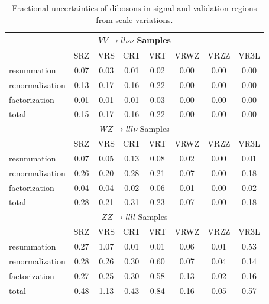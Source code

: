 \begin{table}
	\begin{center}
 		\begin{tabular}{l|c|c|c|c|c|c|c}
		    \hline \hline 
   			\multicolumn{8}{c}{$VV \rightarrow ll\nu\nu$ Samples} \\
  	 		\hline
			&	SRZ & VRS & CRT & VRT & VRWZ & VRZZ & VR3L \\
			\hline
			resummation & 0.07 & 0.03 & 0.01 & 0.02 & 0.00 & 0.00 & 0.00 \\
			renormalization & 0.13 & 0.17 & 0.16 & 0.22 & 0.00 & 0.00 & 0.00 \\
			factorization & 0.01 & 0.01 & 0.01 & 0.03 & 0.00 & 0.00 & 0.00 \\
			total & 0.15 & 0.17 & 0.16 & 0.22 & 0.00 & 0.00 & 0.00 \\
		    \hline 
   			\multicolumn{8}{c}{$WZ \rightarrow lll\nu$ Samples} \\
  	 		\hline
			&	SRZ & VRS & CRT & VRT & VRWZ & VRZZ & VR3L \\
			\hline
			resummation & 0.07 & 0.05 & 0.13 & 0.08 & 0.02 & 0.00 & 0.01 \\
			renormalization & 0.26 & 0.20 & 0.28 & 0.21 & 0.07 & 0.00 & 0.18 \\
			factorization & 0.04 & 0.04 & 0.02 & 0.06 & 0.01 & 0.00 & 0.02 \\
			total & 0.28 & 0.21 & 0.31 & 0.23 & 0.07 & 0.00 & 0.18 \\
  	 		\hline
   			\multicolumn{8}{c}{$ZZ \rightarrow llll$ Samples} \\
  	 		\hline
			&	SRZ & VRS & CRT & VRT & VRWZ & VRZZ & VR3L \\
			\hline
			resummation & 0.27 & 1.07 & 0.01 & 0.01 & 0.06 & 0.01 & 0.53 \\
			renormalization & 0.28 & 0.26 & 0.30 & 0.60 & 0.07 & 0.04 & 0.14 \\
			factorization & 0.27 & 0.25 & 0.30 & 0.58 & 0.13 & 0.02 & 0.16 \\
			total & 0.48 & 1.13 & 0.43 & 0.84 & 0.16 & 0.05 & 0.57 \\
  	 		\hline\hline
 		\end{tabular}
	\end{center}
	\caption{Fractional uncertainties of dibosons in signal and validation regions from \sherpa scale variations.}
	\label{table:Diboson_theoryuncert}
\end{table}

